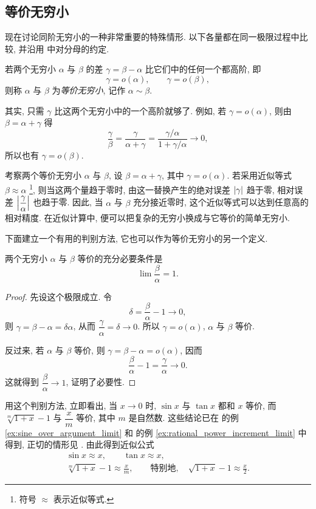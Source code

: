 \subsection{等价无穷小}\label{subsec:62}
现在讨论同阶无穷小的一种非常重要的特殊情形.
以下各量都在同一极限过程中比较, 并沿用  中对分母的约定.

\label{def:equivalent_infinitesimals}
{\kaishu 若两个无穷小 $\alpha$ 与 $\beta$ 的差 $\gamma=\beta-\alpha$
比它们中的任何一个都高阶, 即
$$
\gamma=o(\alpha),\qquad\gamma=o(\beta),
$$
则称 $\alpha$ 与 $\beta$ 为\emph{等价无穷小},
记作 $\alpha\sim\beta$.}

其实, 只需 $\gamma$ 比这两个无穷小中的一个高阶就够了.
例如, 若 $\gamma=o(\alpha)$, 则由 $\beta=\alpha+\gamma$ 得
$$
\frac\gamma\beta
=\frac\gamma{\alpha+\gamma}
=\frac{\gamma/\alpha}{1+\gamma/\alpha}\longrightarrow0,
$$
所以也有 $\gamma=o(\beta)$.

考察两个等价无穷小 $\alpha$ 与 $\beta$,
设 $\beta=\alpha+\gamma$, 其中 $\gamma=o(\alpha)$.
若采用近似等式 $\beta\approx\alpha$
\footnote{符号 $\approx$ 表示近似等式.},
则当这两个量趋于零时, 由这一替换产生的绝对误差 $\left| \gamma \right|$ 趋于零,
相对误差 $\left| \dfrac\gamma\alpha \right|$ 也趋于零.
因此, 当 $\alpha$ 与 $\beta$ 充分接近零时,
这个近似等式可以达到任意高的相对精度.
在近似计算中, 便可以把复杂的无穷小换成与它等价的简单无穷小.

下面建立一个有用的判别方法, 它也可以作为等价无穷小的另一个定义.

{\kaishu
两个无穷小 $\alpha$ 与 $\beta$ 等价的充分必要条件是
$$
\lim\frac\beta\alpha=1.
$$
}

\begin{proof}
先设这个极限成立. 令
$$
\delta=\frac\beta\alpha-1\longrightarrow0,
$$
则 $\gamma=\beta-\alpha=\delta\alpha$,
从而 $\dfrac\gamma\alpha=\delta\to0$.
所以 $\gamma=o(\alpha)$, $\alpha$ 与 $\beta$ 等价.

反过来, 若 $\alpha$ 与 $\beta$ 等价,
则 $\gamma=\beta-\alpha=o(\alpha)$, 因而
$$
\frac\beta\alpha-1=\frac\gamma\alpha\longrightarrow0.
$$
这就得到 $\dfrac\beta\alpha\to1$, 证明了必要性.
\end{proof}

用这个判别方法, 立即看出, 当 $x\to0$ 时,
$\sin x$ 与 $\tan x$ 都和 $x$ 等价,
而 $\sqrt[m]{1+x}-1$ 与 $\dfrac xm$ 等价, 其中 $m$ 是自然数.
这些结论已在  的例 \ref{ex:sine_over_argument_limit}
和  的例 \ref{ex:rational_power_increment_limit} 中得到,
正切的情形见 .
由此得到近似公式
$$
\begin{gathered}
\sin x\approx x,\qquad\tan x\approx x,\\
\sqrt[m]{1+x}-1\approx\frac xm,
\qquad\text{特别地},\quad\sqrt{1+x}-1\approx\frac x2.
\end{gathered}
$$

